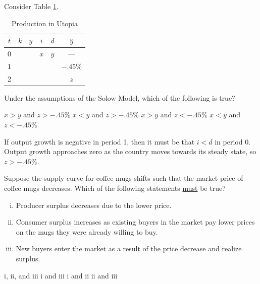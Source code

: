 \documentclass[addpoints,11pt]{exam}
\theoremstyle{definition}
\begin{document}
\begin{questions}
	
\question Consider Table \ref{tab1}. 

\begin{table}[h!]
	\centering
	\caption{Production in Utopia}
	\label{tab1}
	\begin{tabular}{c|c|c|c|c|c}        
		
		$t$ & $k$ & $y$ & $i$ & $d$ & $\hat{y}$ \\
		\hline
		0 &  &  & $x$ & $y$ & ---\\
		1 &  & & &  & $-.45\%$ \\
		2 &  & & & & $z$\\
	\end{tabular}
\end{table}

Under the assumptions of the Solow Model, which of the following is true?

\begin{choices}
\choice $x>y$ and $z>-.45\%$
\CorrectChoice $x<y$ and $z>-.45\%$
\choice $x>y$ and $z<-.45\%$
\choice $x<y$ and $z<-.45\%$
\end{choices}

\begin{solution}
If output growth is negative in period 1, then it must be that $i<d$ in period 0. Output growth approaches zero as the country moves towards its steady state, so $z>-.45\%$.
\end{solution}

\newpage

\question Suppose the supply curve for coffee mugs shifts such that the market price of coffee mugs decreases. Which of the following statements \underline{must} be true?

\begin{enumerate}[i.]
	\item Producer surplus decreases due to the lower price.
	\item Consumer surplus increases as existing buyers in the market pay lower prices on the mugs they were already willing to buy.
	\item New buyers enter the market as a result of the price decrease and realize surplus.
\end{enumerate}

\begin{choices}
	\choice i, ii, and iii
	\choice i and iii
	\choice i and ii
	\CorrectChoice ii and iii
\end{choices}


\end{questions}
\end{document}
